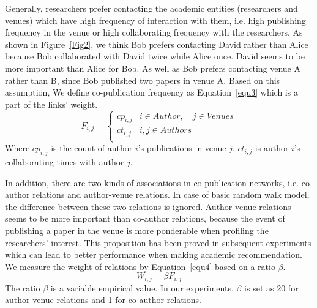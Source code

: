\documentclass[9pt]{acm_proc_article-sp}
\begin{document}
Generally, researchers prefer contacting the academic entities (researchers and venues) which have high frequency of interaction with them, i.e. high publishing frequency in the venue or high collaborating frequency with the researchers. As shown in Figure~\ref{Fig2}, we think Bob prefers contacting David rather than Alice because Bob collaborated with David twice while Alice once. David seems to be more important than Alice for Bob. As well as Bob prefers contacting venue A rather than B, since Bob published two papers in venue A. Based on this assumption, We define co-publication frequency as Equation~\ref{equ3} which is a part of the links' weight.
\begin{equation}
\label{equ3}
F_{i,j}=\left\{\begin{array}{ll}
cp_{i,j} & i\in Author,\quad j\in Venues\\
ct_{i,j} & i,j\in Authors\\
\end{array}\right.
\end{equation}
Where $cp_{i,j}$ is the count of author $i$'s publications in venue $j$. $ct_{i,j}$ is author $i$'s collaborating times with author $j$.

In addition, there are two kinds of associations in co-publication networks, i.e. co-author relations and author-venue relations. In case of basic random walk model, the difference between these two relations is ignored. Author-venue relations seems to be more important than co-author relations, because the event of publishing a paper in the venue is more ponderable when profiling the researchers' interest. This proposition has been proved in subsequent experiments which can lead to better performance when making academic recommendation. We measure the weight of relations by Equation~\ref{equ4} based on a ratio $\beta$.
\begin{equation}
\label{equ4}
W_{i,j}=\beta F_{i,j}
\end{equation}
The ratio $\beta$ is a variable empirical value. In our experiments, $\beta$ is set as 20 for author-venue relations and 1 for co-author relations.
\end{document}
